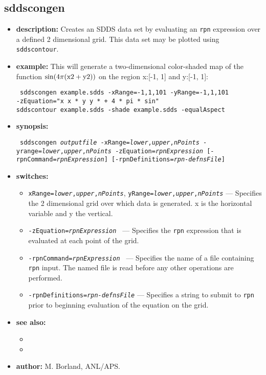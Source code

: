 \newpage
\subsection{sddscongen}
\label{sddscongen}

\begin{itemize}
\item {\bf description:}
Creates an SDDS data set by evaluating an \verb|rpn| expression over a defined 2 dimensional
grid.  This data set may be plotted using \verb|sddscontour|.
\item {\bf example:}
This will generate a two-dimensional color-shaded map of the function ${\rm sin(4\pi (x 2 + y 2))}$ on
the region x:[-1, 1] and y:[-1, 1]:
\begin{flushleft}{\tt
sddscongen example.sdds -xRange=-1,1,101 -yRange=-1,1,101\\
-zEquation="x x * y y * + 4 * pi * sin" \\
sddscontour example.sdds -shade example.sdds -equalAspect
}\end{flushleft}
\item {\bf synopsis:} 
\begin{flushleft}{\tt
sddscongen {\em outputfile} 
-xRange={\em lower},{\em upper},{\em nPoints} -yrange={\em lower},{\em upper},{\em nPoints}
-zEquation={\em rpnExpression} [-rpnCommand={\em rpnExpression}] [-rpnDefinitions={\em rpn-defnsFile}]  
}\end{flushleft}
\item {\bf switches:}
    \begin{itemize}
    \item {\tt xRange={\em lower},{\em upper},{\em nPoints}}, {\tt yRange={\em lower},{\em upper},{\em nPoints}}
         ---  Specifies the 2 dimensional grid over which data is generated.
        x is the horizontal variable and y the vertical.
    \item {\tt -zEquation={\em rpnExpression} } --- 
        Specifies the \verb|rpn| expression that is evaluated at each point of the grid.
    \item {\tt -rpnCommand={\em rpnExpression} } --- 
        Specifies the name of a file containing \verb|rpn| input.  The named file
        is read before any other operations are performed.
    \item {\tt -rpnDefinitions={\em rpn-defnsFile}} --- 
        Specifies a string to submit to \verb|rpn| prior to beginning evaluation of the
        equation on the grid.
    \end{itemize}
\item {\bf see also:}
    \begin{itemize}
    \item {}
    \item {}
    \end{itemize}
\item {\bf author:} M. Borland, ANL/APS.
\end{itemize}


